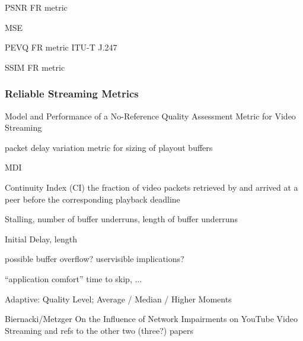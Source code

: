 \gls{PSNR} FR metric

\gls{MSE}

\gls{PEVQ} FR metric ITU-T J.247

\gls{SSIM} FR metric

\subsubsection{Reliable Streaming Metrics}

Model and Performance of a No-Reference Quality Assessment Metric for Video Streaming\cite{DBLP:journals/corr/SeyedebrahimiBP13}

packet delay variation metric for sizing of playout buffers\cite{rfc3393}

\gls{MDI} \cite{rfc4445}

Continuity Index (CI)
the fraction of video packets retrieved by and arrived at a peer before the corresponding playback deadline 

Stalling, number of buffer underruns, length of buffer underruns

Initial Delay, length

possible buffer overflow? uservisible implications?

``application comfort'' time to skip, ...

Adaptive: Quality Level; Average / Median / Higher Moments






Biernacki/Metzger On the Influence of Network Impairments on YouTube Video Streaming \cite{cs3518}
and refs to the other two (three?) papers



